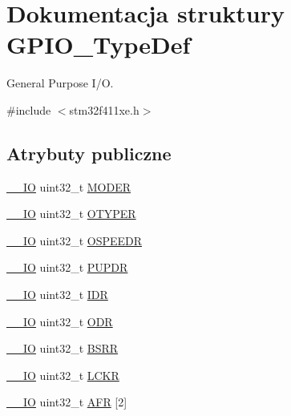 \hypertarget{struct_g_p_i_o___type_def}{}\section{Dokumentacja struktury G\+P\+I\+O\+\_\+\+Type\+Def}
\label{struct_g_p_i_o___type_def}


General Purpose I/O.  




{\ttfamily \#include $<$stm32f411xe.\+h$>$}

\subsection*{Atrybuty publiczne}
\begin{DoxyCompactItemize}
\item 
\hyperlink{core__sc300_8h_aec43007d9998a0a0e01faede4133d6be}{\+\_\+\+\_\+\+IO} uint32\+\_\+t \hyperlink{struct_g_p_i_o___type_def_ac2505d096b6b650f1647b8e0ff8b196b}{M\+O\+D\+ER}
\item 
\hyperlink{core__sc300_8h_aec43007d9998a0a0e01faede4133d6be}{\+\_\+\+\_\+\+IO} uint32\+\_\+t \hyperlink{struct_g_p_i_o___type_def_a910885e4d881c3a459dd11640237107f}{O\+T\+Y\+P\+ER}
\item 
\hyperlink{core__sc300_8h_aec43007d9998a0a0e01faede4133d6be}{\+\_\+\+\_\+\+IO} uint32\+\_\+t \hyperlink{struct_g_p_i_o___type_def_a0d233d720f18ae2050f9131fa6faf7c6}{O\+S\+P\+E\+E\+DR}
\item 
\hyperlink{core__sc300_8h_aec43007d9998a0a0e01faede4133d6be}{\+\_\+\+\_\+\+IO} uint32\+\_\+t \hyperlink{struct_g_p_i_o___type_def_a44ada3bfbe891e2efc1e06bda4c8014e}{P\+U\+P\+DR}
\item 
\hyperlink{core__sc300_8h_aec43007d9998a0a0e01faede4133d6be}{\+\_\+\+\_\+\+IO} uint32\+\_\+t \hyperlink{struct_g_p_i_o___type_def_acf11156409414ad8841bb0b62959ee96}{I\+DR}
\item 
\hyperlink{core__sc300_8h_aec43007d9998a0a0e01faede4133d6be}{\+\_\+\+\_\+\+IO} uint32\+\_\+t \hyperlink{struct_g_p_i_o___type_def_a6fb78f4a978a36032cdeac93ac3c9c8b}{O\+DR}
\item 
\hyperlink{core__sc300_8h_aec43007d9998a0a0e01faede4133d6be}{\+\_\+\+\_\+\+IO} uint32\+\_\+t \hyperlink{struct_g_p_i_o___type_def_acd6f21e08912b484c030ca8b18e11cd6}{B\+S\+RR}
\item 
\hyperlink{core__sc300_8h_aec43007d9998a0a0e01faede4133d6be}{\+\_\+\+\_\+\+IO} uint32\+\_\+t \hyperlink{struct_g_p_i_o___type_def_a95a59d4b1d52be521f3246028be32f3e}{L\+C\+KR}
\item 
\hyperlink{core__sc300_8h_aec43007d9998a0a0e01faede4133d6be}{\+\_\+\+\_\+\+IO} uint32\+\_\+t \hyperlink{struct_g_p_i_o___type_def_a2245603433e102f0fd8a85f7de020755}{A\+FR} \mbox{[}2\mbox{]}
\end{DoxyCompactItemize}


